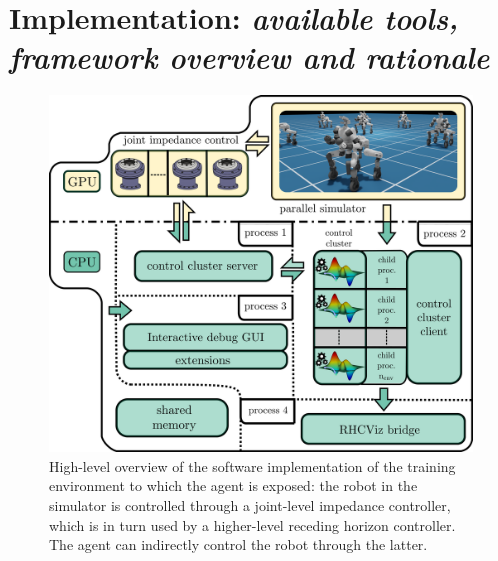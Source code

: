 \section{Implementation: \textnormal{\textit{available tools, framework overview and rationale}}}
\begin{figure}[t]
	\centering
	\includegraphics[width=1.0\columnwidth]{imgs/cocluster_arch.pdf}
	\caption{High-level overview of the software implementation of the training environment to which the agent is exposed: the robot in the simulator is controlled through a joint-level impedance controller, which is in turn used by a higher-level receding horizon controller. The agent can indirectly control the robot through the latter.}
	\label{fig:coclbridge_arch}
\end{figure}
\cite{mystuff::lrhccontrol}
\cite{mystuff::omnirobogym}
\cite{mystuff::coclusterbridge}
\cite{mystuff::rhcviz}
\cite{mystuff::sharsoripcpp}